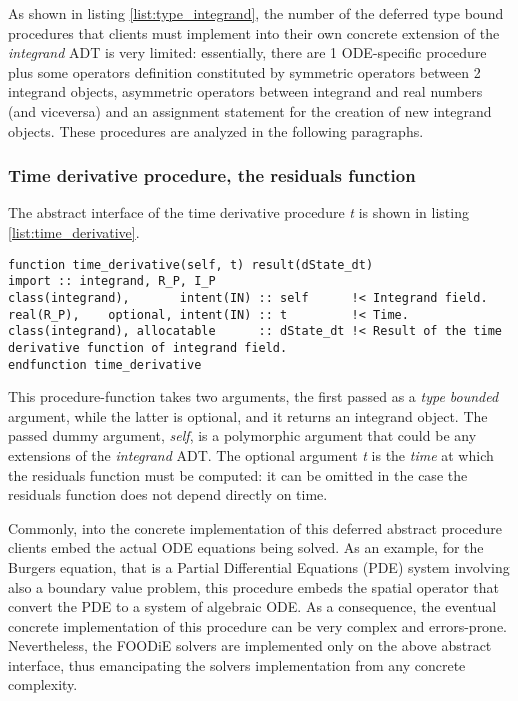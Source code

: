\documentclass[pdftex,preprint,3p,times,numbers]{elsarticle}
\begin{document}
As shown in listing \ref{list:type_integrand}, the number of the deferred type bound procedures that clients must implement into their own concrete extension of the \emph{integrand} ADT is very limited: essentially, there are 1 ODE-specific procedure plus some operators definition constituted by symmetric operators between 2 integrand objects, asymmetric operators between integrand and real numbers (and viceversa) and an assignment statement for the creation of new integrand objects. These procedures are analyzed in the following paragraphs.

\subsubsection{Time derivative procedure, the residuals function}

The abstract interface of the time derivative procedure \emph{t} is shown in listing \ref{list:time_derivative}.

\begin{lstlisting}[firstnumber=1,style=code,caption={time derivative procedure interface},label={list:time_derivative}]
function time_derivative(self, t) result(dState_dt)
import :: integrand, R_P, I_P
class(integrand),       intent(IN) :: self      !< Integrand field.
real(R_P),    optional, intent(IN) :: t         !< Time.
class(integrand), allocatable      :: dState_dt !< Result of the time derivative function of integrand field.
endfunction time_derivative
\end{lstlisting}

This procedure-function takes two arguments, the first passed as a \emph{type bounded} argument, while the latter is optional, and it returns an integrand object. The passed dummy argument, \emph{self}, is a polymorphic argument that could be any extensions of the \emph{integrand} ADT. The optional argument \emph{t} is the \emph{time} at which the residuals function must be computed: it can be omitted in the case the residuals function does not depend directly on time.

Commonly, into the concrete implementation of this deferred abstract procedure clients embed the actual ODE equations being solved. As an example, for the Burgers equation, that is a Partial Differential Equations (PDE) system involving also a boundary value problem, this procedure embeds the spatial operator that convert the PDE to a system of algebraic ODE. As a consequence, the eventual concrete implementation of this procedure can be very complex and errors-prone. Nevertheless, the FOODiE solvers are implemented only on the above abstract interface, thus emancipating the solvers implementation from any concrete complexity.
\end{document}
